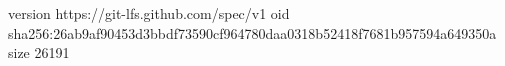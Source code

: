 version https://git-lfs.github.com/spec/v1
oid sha256:26ab9af90453d3bbdf73590cf964780daa0318b52418f7681b957594a649350a
size 26191
